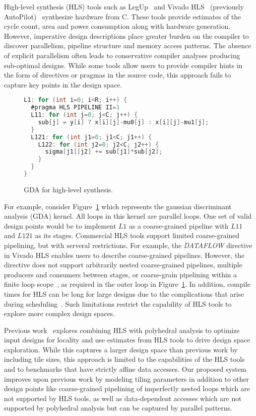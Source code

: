 High-level synthesis (HLS) tools such as LegUp~\cite{legup} and Vivado HLS~\cite{vivadohls} (previously AutoPilot)~\cite{cong11hls}
synthesize hardware from C. These tools provide estimates of the cycle count, area and power consumption
along with hardware generation. However, imperative design descriptions place greater burden on
the compiler to discover parallelism, pipeline structure and memory access patterns.
The absence of explicit parallelism often leads to conservative compiler analyses
producing sub-optimal designs. While some tools allow users to provide compiler
hints in the form of directives or pragmas in the source code, this approach
fails to capture key points in the design space.
\begin{figure}[ht]
\begin{lstlisting}[mathescape=true, numbers=none, language=C]
L1: for (int i=0; i<R; i++) {
  #pragma HLS PIPELINE II=1
  L11: for (int j=0; j<C; j++) {
    sub[j] = y[i] ? x[i][j]-mu0[j] : x[i][j]-mu1[j];
  }
  L121: for (int j1=0; j1<C; j1++) {
    L122: for (int j2=0; j2<C; j2++) {
      sigma[j1][j2] += sub[j1]*sub[j2];
    }
  }
}
\end{lstlisting}
\caption{GDA for high-level synthesis.}
\label{fig:gda-hls}
\end{figure}
For example, consider Figure~\ref{fig:gda-hls} which represents the gaussian discriminant analysis (GDA)
kernel. All loops in this kernel are parallel loops. One set of valid design points would be to implement $L1$
as a coarse-grained pipeline with $L11$ and $L121$ as its stages. Commercial HLS tools support
 limited coarse-grained pipelining, but with serveral restrictions. For example,
the \emph{DATAFLOW} directive in Vivado HLS enables users to describe coarse-grained pipelines.
However, the directive does not support arbitrarily nested coarse-grained pipelines,
multiple producers and consumers between stages, or coarse-grain pipelining within a finite loop scope~\cite{vivadohls_ug}, as required in the outer loop in Figure~\ref{fig:gda-hls}.
In addition, compile times for HLS can be long for large designs due to the complications that
arise during scheduling~\cite{Aladdin}.
Such limitations restrict the capability of HLS tools to explore more complex design spaces.

Previous work~\cite{pouchet13fpga}
explores combining HLS with polyhedral analysis to optimize input designs for locality
and use estimates from HLS tools to drive design space exploration. While this captures a larger design
space than previous work by including tile sizes, this approach is limited to the capabilities
of the HLS tools and to benchmarks that have strictly affine data accesses. Our proposed system improves
upon previous work by modeling tiling
parameters in addition to other design points like coarse-grained pipelining of imperfectly nested loops
which are not supported by HLS tools, as well as data-dependent accesses which are not supported by polyhedral analysis but can be captured by parallel patterns.

